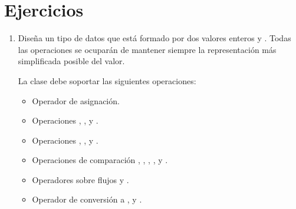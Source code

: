 \section{Ejercicios}

\begin{enumerate}

\item
Diseña un tipo de datos  que está formado por dos valores
enteros  y . Todas las operaciones
se ocuparán de mantener siempre la representación más simplificada posible
del valor.

La clase debe soportar las siguientes operaciones:

\begin{itemize}

\item Operador de asignación.
\item Operaciones \cppkey{+}, \cppkey{-}, \cppkey{*} y \cppkey{/}.
\item Operaciones \cppkey{+=}, \cppkey{-=}, \cppkey{*=} y \cppkey{/=}.
\item Operaciones de comparación \cppkey{==}, \cppkey{!=}, 
      \cppkey{<}, \cppkey{<=}, \cppkey{>} y \cppkey{>=}.
\item Operadores sobre flujos \cppkey{<{}<} y \cppkey{>{}>}.
\item Operador de conversión a ,  y .

\end{itemize}


\end{enumerate}
